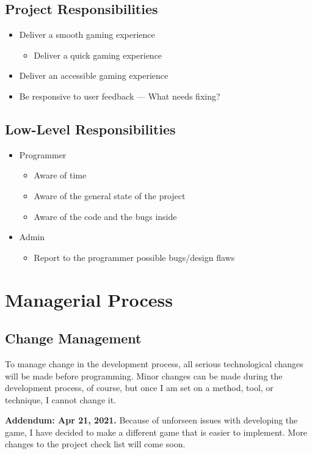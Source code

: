 \documentclass[11pt]{article}
\begin{document}
\subsection{Project Responsibilities}
\label{sec:org428fed2}
\begin{itemize}
\item Deliver a smooth gaming experience
\begin{itemize}
\item Deliver a quick gaming experience
\end{itemize}
\item Deliver an accessible gaming experience
\item Be responsive to user feedback --- What needs fixing?
\end{itemize}
\subsection{Low-Level Responsibilities}
\label{sec:org2855c96}
\begin{itemize}
\item Programmer
\begin{itemize}
\item Aware of time
\item Aware of the general state of the project
\item Aware of the code and the bugs inside
\end{itemize}
\item Admin
\begin{itemize}
\item Report to the programmer possible bugs/design flaws
\end{itemize}
\end{itemize}
\section{Managerial Process}
\label{sec:org745f5bf}
\subsection{Change Management}
\label{sec:orgd2ca751}
To manage change in the development process, all serious technological changes will be made before programming.
Minor changes can be made during the development process, of course, but once I am set on a method, tool,
or technique, I cannot change it.

\textbf{Addendum: Apr 21, 2021.}
Because of unforseen issues with developing the game, I have decided to make a different game that is easier to
implement. More changes to the project check list will come soon.
\end{document}
